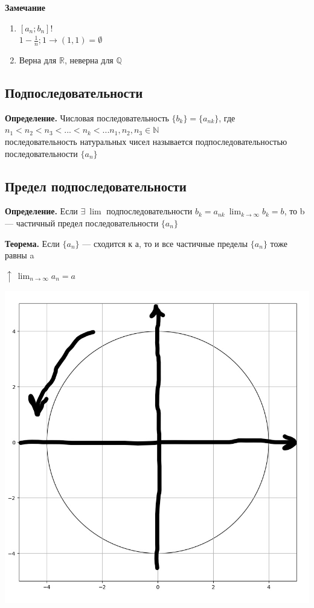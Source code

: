 \documentclass{article}
\begin{document}
    \textbf{Замечание}
	\begin{enumerate}
    	\item \( [a_n; b_n]! \)\\
    	\( 1 - \frac{1}{n}; 1 \rightarrow (1, 1) = \emptyset \)
    	\item Верна для \(\mathbb{R}\), неверна для \(\mathbb{Q}\)
    \end{enumerate}
    
    \subsection{Подпоследовательности}
    
    \textbf{Определение.} Числовая последовательность \( \{b_k\} = \{a_{nk}\} \), где \( n_1 < n_2 < n_3 < ... < n_k < ... n_1,n_2,n_3 \in \mathbb{N} \)\\
    последовательность натуральных чисел называется подпоследовательностью последовательности \( \{ a_n \} \)

    \subsection{Предел подпоследовательности}
    
    \textbf{Определение.} Если \(\exists\ \lim\) подпоследовательности \(b_k = a_{nk}\ \lim_{k \rightarrow \infty}{b_k} = b\), то b --- частичный предел последовательности \(\{a_n\}\)

    \textbf{Теорема.} Если \(\{a_n\}\) --- сходится к а, то и все частичные пределы \(\{a_n\}\) тоже равны a

    \(\uparrow\ \lim_{n \rightarrow \infty}{a_n} = a\)

    \begin{center}
        \includegraphics[scale=0.25]{9}
    \end{center}
        
\end{document}
